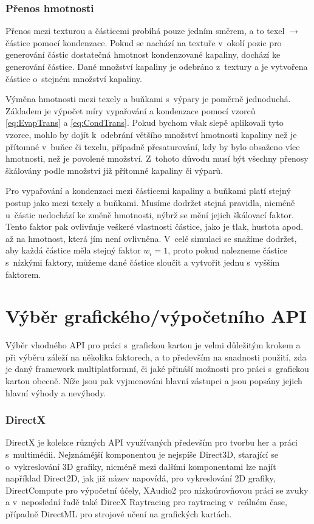 \subsubsection{Přenos hmotnosti}
Přenos mezi texturou a částicemi probíhá pouze jedním směrem, a to texel $\rightarrow$ částice pomocí kondenzace. Pokud se nachází na textuře v~okolí pozic pro generování částic dostatečná hmotnost kondenzované kapaliny, dochází ke generování částice. Dané množství kapaliny je odebráno z~textury a je vytvořena částice o~stejném množství kapaliny.

Výměna hmotnosti mezi texely a buňkami s~výpary je poměrně jednoduchá. Základem je výpočet míry vypařování a kondenzace pomocí vzorců \ref{eq:EvapTrans} a \ref{eq:CondTrans}. Pokud bychom však slepě aplikovali tyto vzorce, mohlo by dojít k~odebrání většího množství hmotnosti kapaliny než je přítomné v~buňce či texelu, případně přesaturování, kdy by bylo obsaženo více hmotnosti, než je povolené množství. Z~tohoto důvodu musí být všechny přenosy škálovány podle množství již přítomné kapaliny či výparů.

Pro vypařování a kondenzaci mezi částicemi kapaliny a buňkami platí stejný postup jako mezi texely a buňkami. Musíme dodržet stejná pravidla, nicméně u~částic nedochází ke změně hmotnosti, nýbrž se mění jejich škálovací faktor. Tento faktor pak ovlivňuje veškeré vlastnosti částice, jako je tlak, hustota apod. až na hmotnost, která jím není ovlivněna. V~celé simulaci se snažíme dodržet, aby každá částice měla stejný faktor $w_i = 1$, proto pokud nalezneme částice s~nízkými faktory, můžeme dané částice sloučit a vytvořit jednu s~vyšším faktorem.

\section{Výběr grafického/výpočetního API}
Výběr vhodného API pro práci s~grafickou kartou je velmi důležitým krokem a při výběru záleží na několika faktorech, a to především na snadnosti použití, zda je daný framework multiplatformní, či jaké přináší možnosti pro práci s~grafickou kartou obecně. Níže jsou pak vyjmenováni hlavní zástupci a jsou popsány jejich hlavní výhody a nevýhody.
\subsubsection{DirectX}
DirectX je kolekce různých API využívaných především pro tvorbu her a práci s~multimédii. Nejznámější komponentou je nejspíše Direct3D, starající se o~vykreslování 3D grafiky, nicméně mezi dalšími komponentami lze najít například Direct2D, jak již název napovídá, pro vykreslování 2D grafiky, DirectCompute pro výpočetní účely, XAudio2 pro nízkoúrovňovou práci se zvuky a v~neposlední řadě také DirecX Raytracing pro raytracing v~reálném čase, případně DirectML pro strojové učení na grafických kartách. \cite{pcmag}

